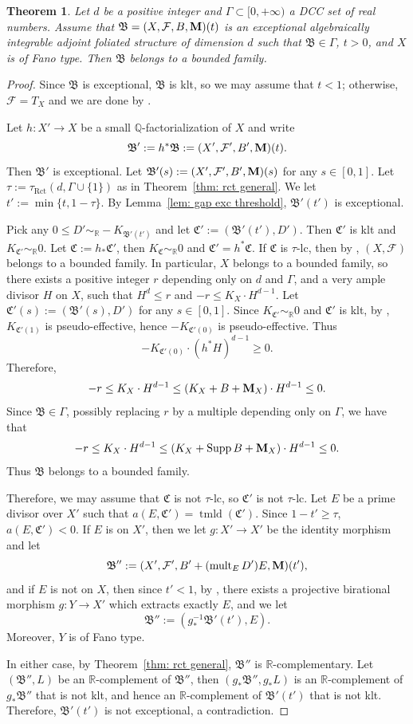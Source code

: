 \documentclass[11pt,reqno]{amsart}
\numberwithin{equation}{section}
\newcommand{\Mm}{{\bf{M}}}
\newcommand{\Cc}{\mathfrak{C}}
\newcommand{\tmld}{{\operatorname{tmld}}}
\newcommand{\Supp}{\operatorname{Supp}}
\newcommand{\mult}{\operatorname{mult}}
\newcommand{\Rct}{\operatorname{Rct}}
\newcommand{\Bb}{{\mathfrak{B}}}
\newcommand{\Ff}{\mathcal{F}}
\newcommand{\Ii}{\Gamma}
\newtheorem{thm}{Theorem}[section]
\theoremstyle{definition}
\begin{document}
\begin{thm}\label{thm: exceptional bdd}
    Let $d$ be a positive integer and $\Ii\subset [0,+\infty)$ a DCC set of real numbers. Assume that $\Bb=(X,\Ff,B,\Mm)(t)$ is an exceptional algebraically integrable adjoint foliated structure of dimension $d$ such that $\Bb\in\Ii$, $t>0$, and $X$ is of Fano type. Then $\Bb$ belongs to a bounded family.
\end{thm}
\begin{proof}
Since $\Bb$ is exceptional, $\Bb$ is klt, so we may assume that $t<1$; otherwise, $\Ff=T_X$ and we are done by \cite[Theorem~1.11]{Bir19}.

Let $h\colon X'\rightarrow X$ be a small $\mathbb Q$-factorialization of $X$ and write 
$$\Bb':=h^*\Bb:=(X',\Ff',B',\Mm)(t).$$
Then $\Bb'$ is exceptional. Let $\Bb'(s):=(X',\Ff',B',\Mm)(s)$ for any $s\in [0,1]$. Let $\tau:=\tau_{\Rct}(d,\Ii\cup\{1\})$ as in Theorem~\ref{thm: rct general}. We let $t':=\min\{t,1-\tau\}$. By Lemma~\ref{lem: gap exc threshold}, $\Bb'(t')$ is exceptional.

Pick any $0\leq D'\sim_{\mathbb R}-K_{\Bb'(t')}$ and let $\Cc':=(\Bb'(t'),D')$. Then $\Cc'$ is klt and $K_{\Cc'}\sim_{\mathbb R}0$. Let $\Cc:=h_*\Cc'$, then $K_{\Cc}\sim_{\mathbb R}0$ and $\Cc'=h^*\Cc$. If $\Cc$ is $\tau$-lc, then by \cite[Theorem~2.4.1]{Cas+25a}, $(X,\Ff)$ belongs to a bounded family. In particular, $X$ belongs to a bounded family, so there exists a positive integer $r$ depending only on $d$ and $\Ii$, and a very ample divisor $H$ on $X$, such that $H^d\leq r$ and $-r\leq K_X\cdot H^{d-1}$. Let $\Cc'(s):=(\Bb'(s),D')$ for any $s\in [0,1]$. Since $K_{\Cc'}\sim_{\mathbb R}0$ and $\Cc'$ is klt, by \cite[Theorem~5.1]{Cas+25a}, $K_{\Cc'(1)}$ is pseudo-effective, hence $-K_{\Cc'(0)}$ is pseudo-effective. Thus
$$-K_{\Cc'(0)}\cdot(h^*H)^{d-1}\geq 0.$$
Therefore,
$$-r\leq K_X\cdot H^{d-1}\leq (K_X+B+\Mm_X)\cdot H^{d-1}\leq 0.$$
Since $\Bb\in\Ii$, possibly replacing $r$ by a multiple depending only on $\Ii$, we have that
$$-r\leq K_X\cdot H^{d-1}\leq (K_X+\Supp B+\Mm_X)\cdot H^{d-1}\leq 0.$$
Thus $\Bb$ belongs to a bounded family.

Therefore, we may assume that $\Cc$ is not $\tau$-lc, so $\Cc'$ is not $\tau$-lc. Let $E$ be a prime divisor over $X'$ such that $a(E,\Cc')=\tmld(\Cc')$. Since $1-t'\geq\tau$, $a(E,\Cc')<0$. If $E$ is on $X'$, then we let $g: X'\rightarrow X'$ be the identity morphism and let
$$\Bb'':=(X',\Ff',B'+(\mult_ED')E,\Mm)(t'),$$
and if $E$ is not on $X$, then since $t'<1$, by \cite[Theorem~2.2.3]{Cas+25a}, there exists a projective birational morphism $g: Y\rightarrow X'$ which extracts exactly $E$, and we let $$\Bb'':=(g^{-1}_*\Bb'(t'),E).$$
Moreover, $Y$ is of Fano type. 

In either case, by Theorem~\ref{thm: rct general}, $\Bb''$ is $\mathbb R$-complementary. Let $(\Bb'',L)$ be an $\mathbb R$-complement of $\Bb''$, then $(g_*\Bb'',g_*L)$ is an $\mathbb R$-complement of $g_*\Bb''$ that is not klt, and hence an $\mathbb R$-complement of $\Bb'(t')$ that is not klt. Therefore, $\Bb'(t')$ is not exceptional, a contradiction.
\end{proof}
\end{document}

